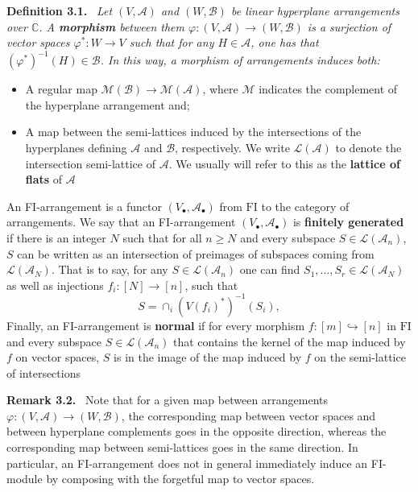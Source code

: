 \documentclass[10pt,a4paper]{article}
\newenvironment{sourceblock}[1]{\par\medskip\noindent\textbf{#1.}\ \itshape}{\par\medskip}
\newenvironment{sourceblockroman}[1]{\par\medskip\noindent\textbf{#1.}\ }{\par\medskip}
\begin{document}
\begin{sourceblock}{Definition 3.1}
Let $(V,\mathcal{A})$ and $(W,\mathcal{B})$ be linear hyperplane arrangements over $\mathbb{C}$. A \textbf{morphism} between them $\varphi:(V,\mathcal{A})\to(W,\mathcal{B})$ is a surjection of vector spaces $\varphi^*:W\to V$ such that for any $H\in\mathcal{A}$, one has that $(\varphi^*)^{-1}(H)\in\mathcal{B}$. In this way, a morphism of arrangements induces both:
\begin{itemize}
\item A regular map $\mathcal{M}(\mathcal{B})\to\mathcal{M}(\mathcal{A})$, where $\mathcal{M}$ indicates the complement of the hyperplane arrangement and;
\item A map between the semi-lattices induced by the intersections of the hyperplanes defining $\mathcal{A}$ and $\mathcal{B}$, respectively. We write $\mathcal{L}(\mathcal{A})$ to denote the intersection semi-lattice of $\mathcal{A}$. We usually will refer to this as the \textbf{lattice of flats} of $\mathcal{A}$
\end{itemize}
An FI-arrangement is a functor $(V_\bullet,\mathcal{A}_\bullet)$ from $\mathrm{FI}$ to the category of arrangements. We say that an FI-arrangement $(V_\bullet,\mathcal{A}_\bullet)$ is \textbf{finitely generated} if there is an integer $N$ such that for all $n\geq N$ and every subspace $S\in\mathcal{L}(\mathcal{A}_n)$, $S$ can be written as an intersection of preimages of subspaces coming from $\mathcal{L}(\mathcal{A}_N)$. That is to say, for any $S\in\mathcal{L}(\mathcal{A}_n)$ one can find $S_1,\ldots,S_r\in\mathcal{L}(\mathcal{A}_N)$ as well as injections $f_i:[N]\to[n]$, such that
\[
 S=\cap_i(V(f_i)^*)^{-1}(S_i),
\]
Finally, an FI-arrangement is \textbf{normal} if for every morphism $f:[m]\hookrightarrow[n]$ in $\mathrm{FI}$ and every subspace $S\in\mathcal{L}(\mathcal{A}_n)$ that contains the kernel of the map induced by $f$ on vector spaces, $S$ is in the image of the map induced by $f$ on the semi-lattice of intersections
\end{sourceblock}
\begin{sourceblockroman}{Remark 3.2}
Note that for a given map between arrangements $\varphi:(V,\mathcal{A})\to(W,\mathcal{B})$, the corresponding map between vector spaces and between hyperplane complements goes in the opposite direction, whereas the corresponding map between semi-lattices goes in the same direction. In particular, an FI-arrangement does not in general immediately induce an FI-module by composing with the forgetful map to vector spaces.
\end{sourceblockroman}
\end{document}
